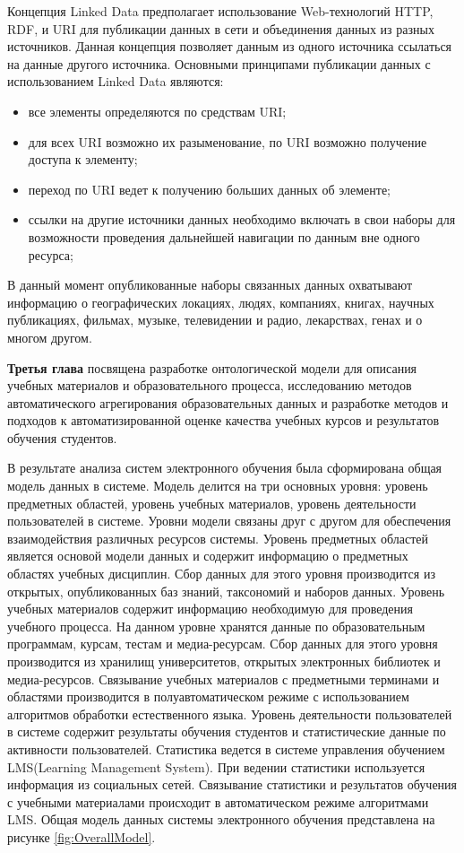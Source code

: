 Концепция Linked Data предполагает использование Web-технологий HTTP, RDF, и URI для публикации данных в сети и объединения данных из разных источников. Данная концепция позволяет данным из одного источника ссылаться на данные другого источника. Основными принципами публикации данных с использованием Linked Data являются:

\begin{itemize}
\item все элементы определяются по средствам URI;
\item для всех URI возможно их разыменование, по URI возможно получение доступа к элементу;
\item переход по URI ведет к получению больших данных об элементе;
\item ссылки на другие источники данных необходимо включать в свои наборы для возможности проведения дальнейшей навигации по данным вне одного ресурса;
\end{itemize}

В данный момент опубликованные наборы связанных данных охватывают информацию о географических локациях, людях, компаниях, книгах, научных публикациях, фильмах, музыке, телевидении и радио, лекарствах, генах и о многом другом.

\textbf{Третья глава} посвящена разработке онтологической модели для описания учебных материалов и образовательного процесса, исследованию методов автоматического агрегирования образовательных данных и разработке методов и подходов к автоматизированной оценке качества учебных курсов и результатов обучения студентов.  

В результате анализа систем электронного обучения была сформирована общая модель данных в системе. Модель делится на три основных уровня: уровень предметных областей, уровень учебных материалов, уровень деятельности пользователей в системе. Уровни модели связаны друг с другом для обеспечения взаимодействия различных ресурсов системы. Уровень предметных областей является основой модели данных и содержит информацию о предметных областях учебных дисциплин. Сбор данных для этого уровня производится из открытых, опубликованных баз знаний, таксономий и наборов данных. Уровень учебных материалов содержит информацию необходимую для проведения учебного процесса. На данном уровне хранятся данные по образовательным программам, курсам, тестам и медиа-ресурсам. Сбор данных для этого уровня производится из хранилищ университетов, открытых электронных библиотек и медиа-ресурсов. Связывание учебных материалов с предметными терминами и областями производится в полуавтоматическом режиме с использованием алгоритмов обработки естественного языка. Уровень деятельности пользователей в системе содержит результаты обучения студентов и  статистические данные по активности пользователей. Статистика ведется в системе управления обучением LMS(Learning Management System). При ведении статистики используется информация из социальных сетей. Связывание статистики и результатов обучения с учебными материалами происходит в автоматическом режиме алгоритмами LMS. Общая модель данных системы электронного обучения представлена на рисунке \ref{fig:OverallModel}. 

